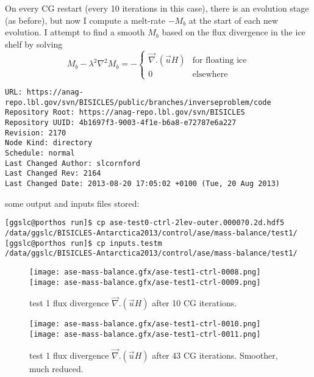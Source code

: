 \documentclass{article}
\begin{document}
On every CG restart (every 10 iterations in this case), there is an evolution stage (as before), but now I compute
a melt-rate $-M_b$ at the start of each new evolution. I attempt to find a smooth $M_b$ based on the flux divergence
in the ice shelf by solving 
\begin{equation}
  M_b - \lambda^2 \nabla ^2 M_b = - \left \{ 
  \begin{array}{lr} 
    \vec{\nabla}. (\vec{u} H) & \mbox{for floating ice} \\
    0 & \mbox{elsewhere}
  \end{array} \right. 
\end{equation}

\begin{verbatim}
URL: https://anag-repo.lbl.gov/svn/BISICLES/public/branches/inverseproblem/code
Repository Root: https://anag-repo.lbl.gov/svn/BISICLES
Repository UUID: 4b1697f3-9003-4f1e-b6a8-e72787e6a227
Revision: 2170
Node Kind: directory
Schedule: normal
Last Changed Author: slcornford
Last Changed Rev: 2164
Last Changed Date: 2013-08-20 17:05:02 +0100 (Tue, 20 Aug 2013)
\end{verbatim}

some output and inputs files stored:
\begin{verbatim}
[ggslc@porthos run]$ cp ase-test0-ctrl-2lev-outer.0000?0.2d.hdf5 
/data/ggslc/BISICLES-Antarctica2013/control/ase/mass-balance/test1/
[ggslc@porthos run]$ cp inputs.testm 
/data/ggslc/BISICLES-Antarctica2013/control/ase/mass-balance/test1/
\end{verbatim}

\begin{figure}
\begin{center}
\texttt{[image: ase-mass-balance.gfx/ase-test1-ctrl-0008.png]}
\texttt{[image: ase-mass-balance.gfx/ase-test1-ctrl-0009.png]}
\end{center}
\caption{\protect{\label{fig::test1a}}} test 1 flux divergence $\vec{\nabla}. (\vec{u} H)$
after 10 CG iterations. 
\end{figure}

\begin{figure}
\begin{center}
\texttt{[image: ase-mass-balance.gfx/ase-test1-ctrl-0010.png]}
\texttt{[image: ase-mass-balance.gfx/ase-test1-ctrl-0011.png]}
\end{center}
\caption{\protect{\label{fig::test1b}}} test 1  flux divergence $\vec{\nabla}. (\vec{u} H)$
after 43 CG iterations. Smoother, much reduced.
\end{figure}
\end{document}

